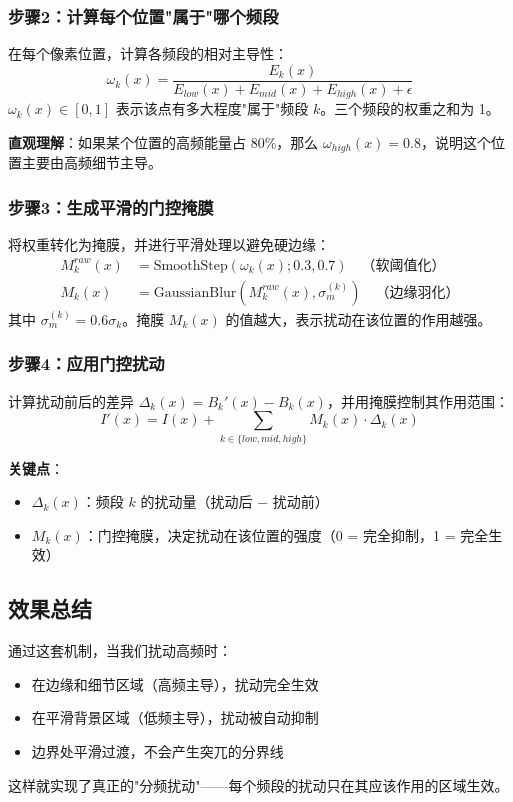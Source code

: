 \documentclass{article}
\begin{document}
\subsubsection{步骤2：计算每个位置"属于"哪个频段}
在每个像素位置，计算各频段的相对主导性：
\begin{equation}
\omega_k(x) = \frac{E_k(x)}{E_{low}(x) + E_{mid}(x) + E_{high}(x) + \epsilon}
\end{equation}
$\omega_k(x) \in [0, 1]$ 表示该点有多大程度"属于"频段 $k$。三个频段的权重之和为 1。

\textbf{直观理解}：如果某个位置的高频能量占 80\%，那么 $\omega_{high}(x) = 0.8$，说明这个位置主要由高频细节主导。

\subsubsection{步骤3：生成平滑的门控掩膜}
将权重转化为掩膜，并进行平滑处理以避免硬边缘：
\begin{align}
M_k^{raw}(x) &= \text{SmoothStep}(\omega_k(x); 0.3, 0.7) \quad \text{（软阈值化）} \\
M_k(x) &= \text{GaussianBlur}(M_k^{raw}(x), \sigma_m^{(k)}) \quad \text{（边缘羽化）}
\end{align}
其中 $\sigma_m^{(k)} = 0.6 \sigma_k$。掩膜 $M_k(x)$ 的值越大，表示扰动在该位置的作用越强。

\subsubsection{步骤4：应用门控扰动}
计算扰动前后的差异 $\Delta_k(x) = B_k'(x) - B_k(x)$，并用掩膜控制其作用范围：
\begin{equation}
I'(x) = I(x) + \sum_{k \in \{low, mid, high\}}  M_k(x) \cdot \Delta_k(x)
\end{equation}

\textbf{关键点}：
\begin{itemize}
    \item $\Delta_k(x)$：频段 $k$ 的扰动量（扰动后 $-$ 扰动前）
    \item $M_k(x)$：门控掩膜，决定扰动在该位置的强度（0 = 完全抑制，1 = 完全生效）
\end{itemize}

\subsection{效果总结}
通过这套机制，当我们扰动高频时：
\begin{itemize}
    \item 在边缘和细节区域（高频主导），扰动完全生效
    \item 在平滑背景区域（低频主导），扰动被自动抑制
    \item 边界处平滑过渡，不会产生突兀的分界线
\end{itemize}
这样就实现了真正的"分频扰动"——每个频段的扰动只在其应该作用的区域生效。
\end{document}
